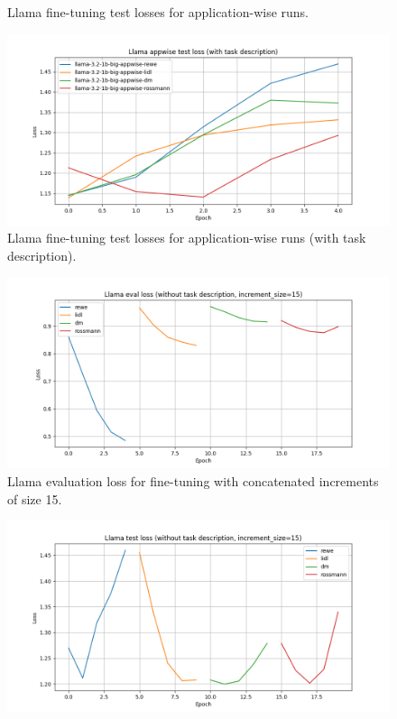 \documentclass[licencjacka,en]{pracamgr}
\begin{document}
\begin{appendices}
\begin{figure}[ht]
    \caption{Llama fine-tuning test losses for application-wise runs.}
    \label{fig:llama-wth-appwise}
\end{figure}
\begin{figure}[ht]
    \centering
    \includegraphics[width=0.8\linewidth]{bachelor_images/llama_ft/llama-appwise-w-test.png}
    \caption{Llama fine-tuning test losses for application-wise runs (with task description).}
    \label{fig:llama-w-appwise}
\end{figure}
\begin{figure}[ht]
    \centering
    \includegraphics[width=0.8\linewidth]{bachelor_images/llama_ft/llama-inc-15-tot-eval.png}
    \caption{Llama evaluation loss for fine-tuning with concatenated increments of size 15.}
    \label{fig:llama-inc-tot-15-eval}
\end{figure}
\begin{figure}[ht]
    \centering
    \includegraphics[width=0.8\linewidth]{bachelor_images/llama_ft/llama-inc-15-tot-test.png}

\end{figure}
\end{appendices}
\end{document}

